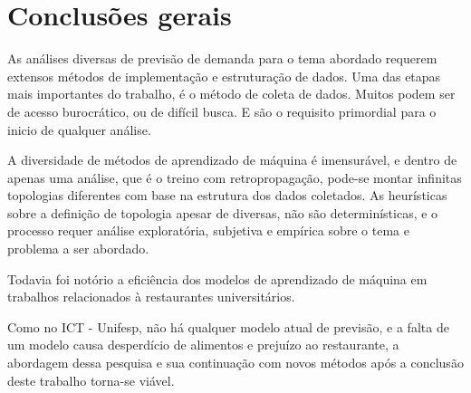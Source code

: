 \documentclass[	12pt, Times, openright, twoside, a4paper, english, brazil]{abntex2}
\begin{document}
    \section{Conclusões gerais}
         As análises diversas de previsão de demanda para o tema abordado requerem extensos métodos de implementação e estruturação de dados.
        Uma das etapas mais importantes do trabalho, é o método de coleta de dados. Muitos podem ser de acesso burocrático, ou de difícil busca. E são o requisito primordial para o inicio de qualquer análise.
        
         A diversidade de métodos de aprendizado de máquina é imensurável, e dentro de apenas uma análise, que é o treino com retropropagação, pode-se montar infinitas topologias diferentes com base na estrutura dos dados coletados. 
        As heurísticas sobre a definição de topologia apesar de diversas, não são determinísticas, e o processo requer análise exploratória, subjetiva e empírica sobre o tema e problema a ser abordado.
        
         Todavia foi notório a eficiência dos modelos de aprendizado de máquina em trabalhos relacionados à restaurantes universitários. 
        
         Como no ICT - Unifesp, não há qualquer modelo atual de previsão, e a falta de um modelo causa desperdício de alimentos e prejuízo ao restaurante, a abordagem dessa pesquisa e sua continuação com novos métodos após a conclusão deste trabalho torna-se viável.



\end{document}
